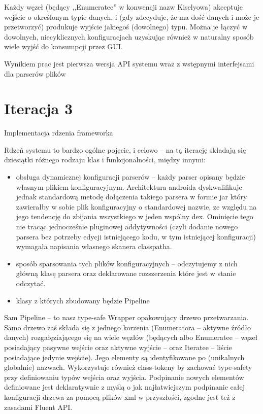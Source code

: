 \begin{Note}
Każdy węzeł (będący ,,Enumeratee'' w konwencji nazw Kiselyowa) akceptuje wejście o określonym typie danych, i (gdy zdecyduje, że ma dość danych i może je przetworzyć) produkuje wyjście jakiegoś (dowolnego) typu. Można je łączyć w dowolnych, niecyklicznych konfiguracjach uzyskując również w naturalny sposób wiele wyjść do konsumpcji przez GUI.

Wynikiem prac jest pierwsza wersja API systemu wraz z wstępnymi interfejsami dla parserów plików

\end{Note}

\section{Iteracja 3}

\begin{Note}

	Implementacja rdzenia frameworka


Rdzeń systemu to bardzo ogólne pojęcie, i celowo -- na tą iterację składają się dziesiątki różnego rodzaju klas i funkcjonalności, między innymi:

\begin{itemize}
    \item obsługa dynamicznej konfiguracji parserów --  każdy parser opisany będzie własnym plikiem konfiguracyjnym. Architektura androida dyskwalifikuje jednak standardową metodę dołączenia takiego parsera w formie jar który zawierałby w sobie plik konfiguracyjny o standardowej nazwie, ze względu na jego tendencję do zbijania wszystkiego w jeden wspólny dex. Ominięcie tego nie tracąc jednocześnie pluginowej addytywności (czyli dodanie nowego parsera bez potrzeby edycji istniejącego kodu, w tym istniejącej konfiguracji) wymagała napisania własnego skanera classpatha.
    \item sposób sparsowania tych plików konfiguracyjnych -- odczytujemy z nich główną klasę parsera oraz deklarowane rozszerzenia które jest w stanie odczytać.
    \item klasy z których zbudowany będzie Pipeline
\end{itemize}

Sam Pipeline -- to nasz type-safe Wrapper opakowujący drzewo przetwarzania. Samo drzewo zaś składa
się z jednego korzenia (Enumeratora -- aktywne źródło danych) rozgałęziającego się na wiele węzłów
(będących albo Enumeratee -- węzeł posiadający pasywne wejście oraz aktywne wyjście -- oraz Iteratee
-- liście posiadające jedynie wejście). Jego elementy są identyfikowane po (unikalnych globalnie) nazwach. Wykorzystuje również class-tokeny by zachować type-safety przy definiowaniu typów wejścia oraz wyjścia. Podpinanie nowych elementów definiowane jest deklaratywnie z myślą o jak najłatwiejszym podpinanie całej konfiguracji drzewa za pomocą plików xml w przyszłości, zgodne jest też z zasadami Fluent API.


\end{Note}

